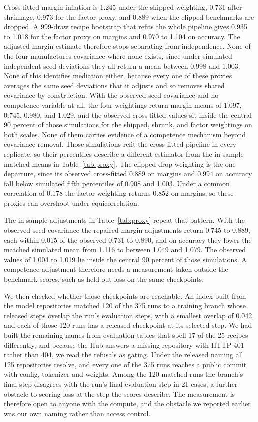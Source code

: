 Cross-fitted margin inflation is 1.245 under the shipped weighting, 0.731 after shrinkage, 0.973 for the factor proxy, and 0.889 when the clipped benchmarks are dropped. A 999-draw recipe bootstrap that refits the whole pipeline gives 0.935 to 1.018 for the factor proxy on margins and 0.970 to 1.104 on accuracy. The adjusted margin estimate therefore stops separating from independence. None of the four manufactures covariance where none exists, since under simulated independent seed deviations they all return a mean between 0.998 and 1.003. None of this identifies mediation either, because every one of these proxies averages the same seed deviations that it adjusts and so removes shared covariance by construction. With the observed seed covariance and no competence variable at all, the four weightings return margin means of 1.097, 0.745, 0.980, and 1.029, and the observed cross-fitted values sit inside the central 90 percent of those simulations for the shipped, shrunk, and factor weightings on both scales. None of them carries evidence of a competence mechanism beyond covariance removal. Those simulations refit the cross-fitted pipeline in every replicate, so their percentiles describe a different estimator from the in-sample matched means in Table~\ref{tab:proxy}. The clipped-drop weighting is the one departure, since its observed cross-fitted 0.889 on margins and 0.994 on accuracy fall below simulated fifth percentiles of 0.908 and 1.003. Under a common correlation of 0.178 the factor weighting returns 0.852 on margins, so these proxies can overshoot under equicorrelation.

The in-sample adjustments in Table~\ref{tab:proxy} repeat that pattern. With the observed seed covariance the repaired margin adjustments return 0.745 to 0.889, each within 0.015 of the observed 0.731 to 0.890, and on accuracy they lower the matched simulated mean from 1.116 to between 1.049 and 1.079. The observed values of 1.004 to 1.019 lie inside the central 90 percent of those simulations. A competence adjustment therefore needs a measurement taken outside the benchmark scores, such as held-out loss on the same checkpoints.

We then checked whether those checkpoints are reachable. An index built from the model repositories matched 120 of the 375 runs to a training branch whose released steps overlap the run's evaluation steps, with a smallest overlap of 0.042, and each of those 120 runs has a released checkpoint at its selected step. We had built the remaining names from evaluation tables that spell 17 of the 25 recipes differently, and because the Hub answers a missing repository with HTTP 401 rather than 404, we read the refusals as gating. Under the released naming all 125 repositories resolve, and every one of the 375 runs reaches a public commit with config, tokenizer and weights. Among the 120 matched runs the branch's final step disagrees with the run's final evaluation step in 21 cases, a further obstacle to scoring loss at the step the scores describe. The measurement is therefore open to anyone with the compute, and the obstacle we reported earlier was our own naming rather than access control.

